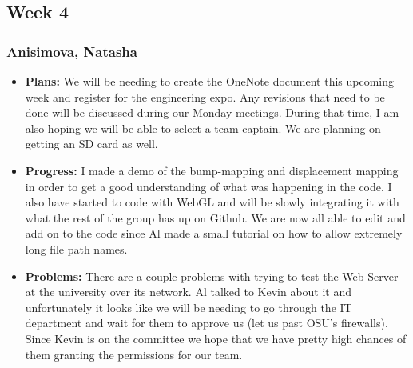 \documentclass[10pt,draftclsnofoot,onecolumn]{IEEEtran}
\begin{document}
\subsection{Week 4}
\subsubsection{Anisimova, Natasha}
\begin{itemize}
	\item \textbf{Plans: }
	We will be needing to create the OneNote document this upcoming week and register for the engineering expo. Any revisions that need to be done will be discussed during our Monday meetings. During that time, I am also hoping we will be able to select a team captain. We are planning on getting an SD card as well.
	\item \textbf{Progress: }
	I made a demo of the bump-mapping and displacement mapping in order to get a good understanding of what was happening in the code. I also have started to code with WebGL and will be slowly integrating it with what the rest of the group has up on Github. We are now all able to edit and add on to the code since Al made a small tutorial on how to allow extremely long file path names.
	\item \textbf{Problems: }
	There are a couple problems with trying to test the Web Server at the university over its network. Al talked to Kevin about it and unfortunately it looks like we will be needing to go through the IT department and wait for them to approve us (let us past OSU's firewalls). Since Kevin is on the committee we hope that we have pretty high chances of them granting the permissions for our team.
\end{itemize}
\end{document}
